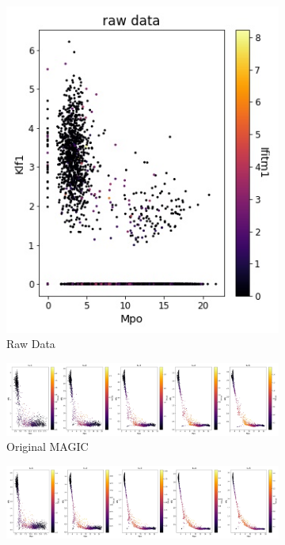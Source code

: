 \documentclass{article}
\begin{document}
\begin{figure}[h!]
    \centering
    \begin{subfigure}{0.25\textwidth}
    \includegraphics[width=\textwidth]{LaTeX/figures/MAGICdata.jpg}
    \caption{Raw Data}
    \end{subfigure}
    \begin{subfigure}{0.9\textwidth}
    \includegraphics[width=\textwidth]{LaTeX/figures/ORG_MAGIC.jpg}
    \caption{Original MAGIC}
    \end{subfigure}
    \begin{subfigure}{0.9\textwidth}
    \includegraphics[width=\textwidth]{LaTeX/figures/QOT_MAGIC.jpg}

\end{subfigure}
\end{figure}
\end{document}
